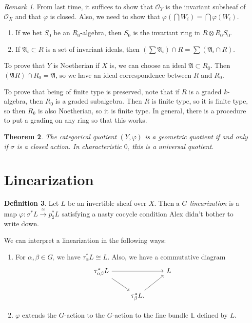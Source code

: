 \documentclass[leqno, openany]{memoir}
\newtheorem{thm}{Theorem}[section]
\theoremstyle{definition}
\newtheorem{defn}[thm]{Definition}
\theoremstyle{remark}
\newtheorem{rmk}[thm]{Remark}
\theoremstyle{plain}
\theoremstyle{definition}
\theoremstyle{remark}
\newcommand{\mc}[1]{\mathcal{#1}}
\newcommand{\mf}[1]{\mathfrak{#1}}
\begin{document}
\begin{rmk}
    From last time, it suffices to show that $\mc{O}_Y$ is the invariant subsheaf of $\mc{O}_X$ and that $\varphi$ is closed. Also, we need to show that $\varphi(\bigcap W_i) = \bigcap \varphi(W_i)$.
\end{rmk}

\begin{enumerate}
    \item If we bet $S_0$ be an $R_0$-algebra, then $S_0$ is the invariant ring in $R \otimes R_0 S_0$.
    \item If $\mf{A}_i \subset R$ is a set of invariant ideals, then $(\sum \mf{A}_i) \cap R = \sum(\mf{A}_i \cap R)$.
\end{enumerate}

To prove that $Y$ is Noetherian if $X$ is, we can choose an ideal $\mf{A} \subset R_0$. Then $(\mf{A} R) \cap R_0 = \mf{A}$, so we have an ideal correspondence between $R$ and $R_0$.

To prove that being of finite type is preserved, note that if $R$ is a graded $k$-algebra, then $R_0$ is a graded subalgebra. Then $R$ is finite type, so it is finite type, so then $R_0$ is also Noetherian, so it is finite type. In general, there is a procedure to put a grading on any ring so that this works.

\begin{thm}
    The categorical quotient $(Y, \varphi)$ is a geometric quotient if and only if $\sigma$ is a closed action. In characteristic $0$, this is a universal quotient.
\end{thm}

\section{Linearization}%
\label{sec:linearization}

\begin{defn}
    Let $L$ be an invertible sheaf over $X$. Then a \textit{$G$-linearization} is a map $\varphi \colon \sigma^* L \xrightarrow{\cong} p_2^* L$ satisfying a nasty cocycle condition Alex didn't bother to write down.
\end{defn}

We can interpret a linearization in the following ways:
\begin{enumerate}
    \item For $\alpha, \beta \in G$, we have $\tau_{\alpha}^* L \cong L$. Also, we have a commutative diagram
        \begin{equation*}
        \begin{tikzcd}
            \tau_{\alpha \beta}^*L \arrow{rr} \arrow{dr} && L \\
                                                         & \tau_{\beta}^* L. \arrow{ur}
        \end{tikzcd}
        \end{equation*}
    \item $\varphi$ extends the $G$-action to the $G$-action to the line bundle $\mathbb{L}$ defined by $L$.
\end{enumerate}
\end{document}
